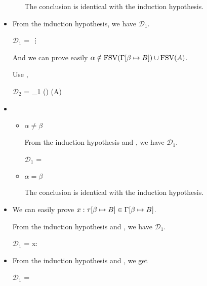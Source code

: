 \begin{itemize}
\begin{itemize}
		            The conclusion is identical with the induction hypothesis.

	      \end{itemize}


	\item \KGen

	      From the induction hypothesis, we have $\mathcal{D}_1$.

	      $\mathcal{D}_1$ = 
	      {\vdots}

	      And we can prove easily $\alpha \notin \text{FSV}(\Gamma[\beta \mapsto B]) \cup \text{FSV}(A)$.

	      Use \KGen,

	      $\mathcal{D}_2$ = 
	      {_1 \andalso \alpha \notin \FTV(\GG) \cup \FTV(A)}

	\item \KCsp

	      \begin{itemize}

		      \item $\alpha \neq \beta$

		            From the induction hypothesis and \KCsp, we have $\mathcal{D}_1$.

		            $\mathcal{D}_1$ = 
		            {}

		      \item $\alpha = \beta$

		            The conclusion is identical with the induction hypothesis.

	      \end{itemize}

	\item \TVar

	      We can easily prove $x:\tau[\beta \mapsto B] \in \Gamma[\beta \mapsto B]$.

	      From the induction hypothesis and \TVar, we have $\mathcal{D}_1$.

	      $\mathcal{D}_1$ = 
	      {x:\tau\SB \in \GG \andalso {}}

	\item \TAbs

	      From the induction hypothesis and \TAbs, we get

	      $\mathcal{D}_1$ = 
	      { \andalso {}}


\end{itemize}
